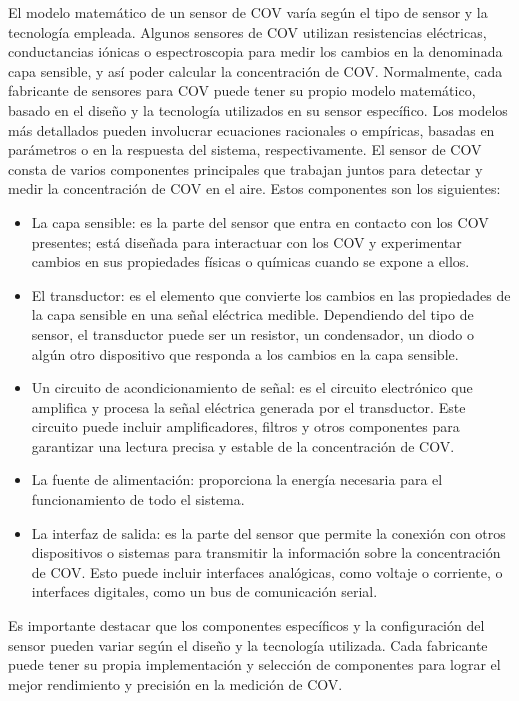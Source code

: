El modelo matemático de un sensor de COV varía según el tipo de sensor y la tecnología empleada. Algunos sensores de COV utilizan resistencias eléctricas, conductancias iónicas o espectroscopia para medir los cambios en la denominada capa sensible, y así poder calcular la concentración de COV.
Normalmente, cada fabricante de sensores para COV puede tener su propio modelo matemático, basado en el diseño y la tecnología utilizados en su sensor específico. Los modelos más detallados pueden involucrar ecuaciones racionales o empíricas, basadas en parámetros o en la respuesta del sistema, respectivamente.
El sensor de COV consta de varios componentes principales que trabajan juntos para detectar y medir la concentración de COV en el aire. Estos componentes son los siguientes:
\begin{itemize}
  \item La capa sensible: es la parte del sensor que entra en contacto con los COV presentes; está diseñada para interactuar con los COV y experimentar cambios en sus propiedades físicas o químicas cuando se expone a ellos.
  \item El transductor: es el elemento que convierte los cambios en las propiedades de la capa sensible en una señal eléctrica medible. Dependiendo del tipo de sensor, el transductor puede ser un resistor, un condensador, un diodo o algún otro dispositivo que responda a los cambios en la capa sensible.
  \item Un circuito de acondicionamiento de señal: es el circuito electrónico que amplifica y procesa la señal eléctrica generada por el transductor. Este circuito puede incluir amplificadores, filtros y otros componentes para garantizar una lectura precisa y estable de la concentración de COV.
  \item La fuente de alimentación: proporciona la energía necesaria para el funcionamiento de todo el sistema.
  \item La interfaz de salida: es la parte del sensor que permite la conexión con otros dispositivos o sistemas para transmitir la información sobre la concentración de COV. Esto puede incluir interfaces analógicas, como voltaje o corriente, o interfaces digitales, como un bus de comunicación serial.
\end{itemize}
Es importante destacar que los componentes específicos y la configuración del sensor pueden variar según el diseño y la tecnología utilizada. Cada fabricante puede tener su propia implementación y selección de componentes para lograr el mejor rendimiento y precisión en la medición de COV.

